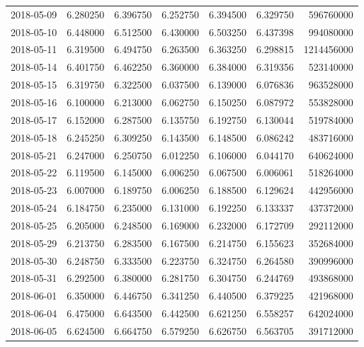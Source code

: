 \begin{tabular}{lrrrrrr}
2018-05-09 &    6.280250 &    6.396750 &    6.252750 &    6.394500 &    6.329750 &   596760000 \\
2018-05-10 &    6.448000 &    6.512500 &    6.430000 &    6.503250 &    6.437398 &   994080000 \\
2018-05-11 &    6.319500 &    6.494750 &    6.263500 &    6.363250 &    6.298815 &  1214456000 \\
2018-05-14 &    6.401750 &    6.462250 &    6.360000 &    6.384000 &    6.319356 &   523140000 \\
2018-05-15 &    6.319750 &    6.322500 &    6.037500 &    6.139000 &    6.076836 &   963528000 \\
2018-05-16 &    6.100000 &    6.213000 &    6.062750 &    6.150250 &    6.087972 &   553828000 \\
2018-05-17 &    6.152000 &    6.287500 &    6.135750 &    6.192750 &    6.130044 &   519784000 \\
2018-05-18 &    6.245250 &    6.309250 &    6.143500 &    6.148500 &    6.086242 &   483716000 \\
2018-05-21 &    6.247000 &    6.250750 &    6.012250 &    6.106000 &    6.044170 &   640624000 \\
2018-05-22 &    6.119500 &    6.145000 &    6.006250 &    6.067500 &    6.006061 &   518264000 \\
2018-05-23 &    6.007000 &    6.189750 &    6.006250 &    6.188500 &    6.129624 &   442956000 \\
2018-05-24 &    6.184750 &    6.235000 &    6.131000 &    6.192250 &    6.133337 &   437372000 \\
2018-05-25 &    6.205000 &    6.248500 &    6.169000 &    6.232000 &    6.172709 &   292112000 \\
2018-05-29 &    6.213750 &    6.283500 &    6.167500 &    6.214750 &    6.155623 &   352684000 \\
2018-05-30 &    6.248750 &    6.333500 &    6.223750 &    6.324750 &    6.264580 &   390996000 \\
2018-05-31 &    6.292500 &    6.380000 &    6.281750 &    6.304750 &    6.244769 &   493868000 \\
2018-06-01 &    6.350000 &    6.446750 &    6.341250 &    6.440500 &    6.379225 &   421968000 \\
2018-06-04 &    6.475000 &    6.643500 &    6.442500 &    6.621250 &    6.558257 &   642024000 \\
2018-06-05 &    6.624500 &    6.664750 &    6.579250 &    6.626750 &    6.563705 &   391712000 \\

\end{tabular}
